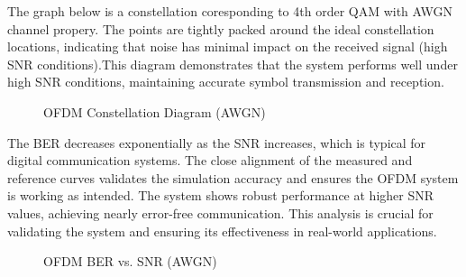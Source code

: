 \documentclass[conference]{IEEEtran}
\begin{document}
  The graph below is a constellation coresponding to 4th order QAM with AWGN channel propery.  The points are tightly packed around the ideal constellation locations, indicating that noise has minimal impact on the received signal (high SNR conditions).This diagram demonstrates that the system performs well under high SNR conditions, maintaining accurate symbol transmission and reception.
    
    
     \begin{figure}[H]
		\centering
    		\caption{OFDM Constellation Diagram  (AWGN) }
  	  \end{figure}
    
    The BER decreases exponentially as the SNR increases, which is typical for digital communication systems. The close alignment of the measured and reference curves validates the simulation accuracy and ensures the OFDM system is working as intended. The system shows robust performance at higher SNR values, achieving nearly error-free communication. This analysis is crucial for validating the system and ensuring its effectiveness in real-world applications.
    
    
         \begin{figure}[H]
		\centering
    		\caption{OFDM BER vs. SNR (AWGN) }
  	  \end{figure}
    
\end{document}
